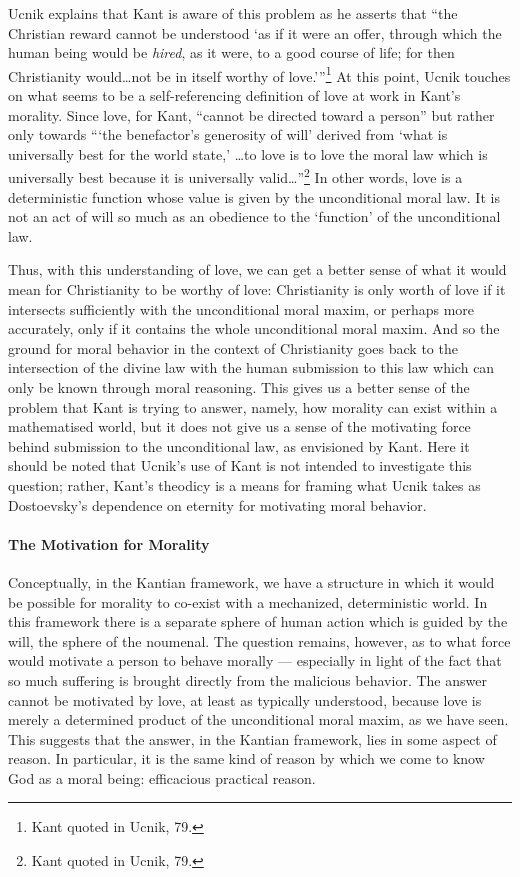 \documentclass[12pt]{article}
\begin{document}
	Ucnik explains that Kant is aware of this problem as he asserts that ``the Christian reward cannot be understood `as if it were an offer, through which the human being would be \emph{hired}, as it were, to a good course of life; for then Christianity would\ldots not be in itself worthy of love.'\thinspace''\footnote{Kant quoted in Ucnik, 79.} At this point, Ucnik touches on what seems to be a self-referencing definition of love at work in Kant's morality. Since love, for Kant, ``cannot be directed toward a person'' but rather only towards ``\thinspace`the benefactor's generosity of will' derived from `what is universally best for the world state,' \ldots to love is to love the moral law which is universally best because it is universally valid\ldots''\footnote{Kant quoted in Ucnik, 79.} In other words, love is a deterministic function whose value is given by the unconditional moral law. It is not an act of will so much as an obedience to the `function' of the unconditional law. 
	
	Thus, with this understanding of love, we can get a better sense of what it would mean for Christianity to be worthy of love: Christianity is only worth of love if it intersects sufficiently with the unconditional moral maxim, or perhaps more accurately, only if it contains the whole unconditional moral maxim. And so the ground for moral behavior in the context of Christianity goes back to the intersection of the divine law with the human submission to this law which can only be known through moral reasoning. This gives us a better sense of the problem that Kant is trying to answer, namely, how morality can exist within a mathematised world, but it does not give us a sense of the motivating force behind submission to the unconditional law, as envisioned by Kant. Here it should be noted that Ucnik's use of Kant is not intended to investigate this question; rather, Kant's theodicy is a means for framing what Ucnik takes as Dostoevsky's dependence on eternity for motivating moral behavior. 
	
	\paragraph*{The Motivation for Morality} Conceptually, in the Kantian framework, we have a structure in which it would be possible for morality to co-exist with a mechanized, deterministic world. In this framework there is a separate sphere of human action which is guided by the will, the sphere of the noumenal. The question remains, however, as to what force would motivate a person to behave morally --- especially in light of the fact that so much suffering is brought directly from the malicious behavior. The answer cannot be motivated by love, at least as typically understood, because love is merely a determined product of the unconditional moral maxim, as we have seen. This suggests that the answer, in the Kantian framework, lies in some aspect of reason. In particular, it is the same kind of reason by which we come to know God as a moral being: efficacious practical reason.
	
\end{document}
